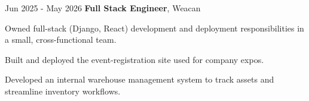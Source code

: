 \begin{twocolentry}{
        Jun 2025 - May 2026
    }
\textbf{Full Stack Engineer}, Weacan\end{twocolentry}

\vspace{0.10 cm}
\begin{onecolentry}
    \begin{highlights}
        \item Owned full-stack (Django, React) development and deployment responsibilities in a small, cross-functional team.
        \item Built and deployed the event-registration site used for company expos.
        \item Developed an internal warehouse management system to track assets and streamline inventory workflows.
    \end{highlights}
\end{onecolentry}